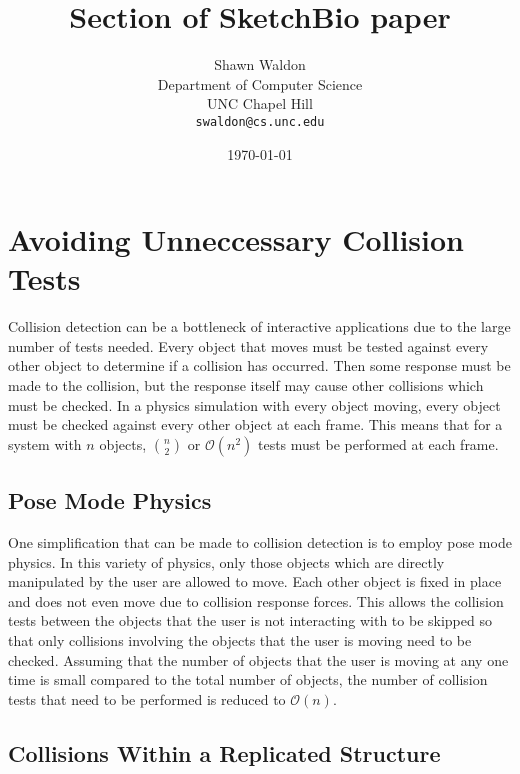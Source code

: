 \documentclass{article} %
\begin{document}
\title{Section of SketchBio paper}
\author{Shawn Waldon\\Department of Computer Science\\
			UNC Chapel Hill\\\texttt{swaldon@cs.unc.edu}}
\date{\today}
\maketitle

\section{Avoiding Unneccessary Collision Tests}
Collision detection can be a bottleneck of interactive applications due to the large number of tests needed.  Every object that moves must be tested against every other object to determine if a collision has occurred.  Then some response must be made to the collision, but the response itself may cause other collisions which must be checked.  In a physics simulation with every object moving, every object must be checked against every other object at each frame.  This means that for a system with $n$ objects, ${n \choose 2}$ or $\mathcal{O}(n^2)$ tests must be performed at each frame.

\subsection{Pose Mode Physics}
One simplification that can be made to collision detection is to employ pose mode physics.  In this variety of physics, only those objects which are directly manipulated by the user are allowed to move.  Each other object is fixed in place and does not even move due to collision response forces.  This allows the collision tests between the objects that the user is not interacting with to be skipped so that only collisions involving the objects that the user is moving need to be checked.  Assuming that the number of objects that the user is moving at any one time is small compared to the total number of objects, the number of collision tests that need to be performed is reduced to $\mathcal{O}(n)$.

\subsection{Collisions Within a Replicated Structure}

\end{document}
